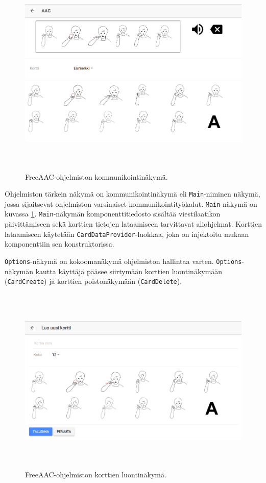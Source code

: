 \documentclass[utf8]{gradu3}
\begin{document}
\begin{figure}[h]\centering
  \includegraphics[height=10cm,keepaspectratio]{main-view-layout}
  \caption[FreeAAC-ohjelmiston kommunikointinäkymä.]
  {FreeAAC-ohjelmiston kommunikointinäkymä.}
  \label{fig:main-view-layout}
\end{figure}

Ohjelmiston tärkein näkymä on kommunikointinäkymä eli \texttt{Main}-niminen näkymä, jossa sijaitsevat ohjelmiston varsinaiset kommunikointityökalut. \texttt{Main}-näkymä on kuvassa \ref{fig:main-view-layout}. \texttt{Main}-näkymän komponenttitiedosto sisältää viestilaatikon päivittämiseen sekä korttien tietojen lataamiseen tarvittavat aliohjelmat. Korttien lataamiseen käytetään \texttt{CardDataProvider}-luokkaa, joka on injektoitu mukaan komponenttiin sen konstruktorissa.

\texttt{Options}-näkymä on kokoomanäkymä ohjelmiston hallintaa varten. \texttt{Options}-näkymän kautta käyttäjä pääsee siirtymään korttien luontinäkymään (\texttt{CardCreate}) ja korttien poistonäkymään (\texttt{CardDelete}).

\begin{figure}[h]\centering
  \includegraphics[height=9cm,keepaspectratio]{card-create-layout}
  \caption[FreeAAC-ohjelmiston korttien luontinäkymä.]
  {FreeAAC-ohjelmiston korttien luontinäkymä.}
  \label{fig:card-create-layout}
\end{figure}
\end{document}

